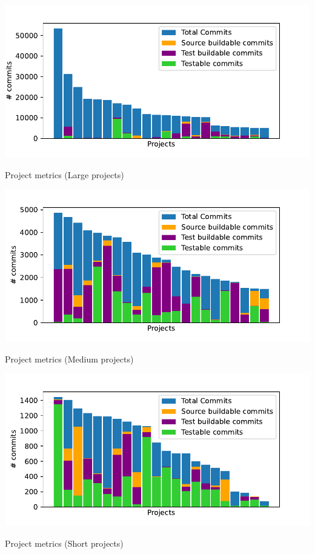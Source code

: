 \begin{table}[!htb]
    \centering
    \begin{minipage}{.5\linewidth}
        \centering    
        \includegraphics[width=\linewidth]{pages/02-Testability/images/Many4j 1-22.pdf}
        \caption{Project metrics (Large projects)}
        \label{fig:many4j-1-bar-chart}
    \end{minipage}%
    \begin{minipage}{.5\linewidth}
        \centering    
        \includegraphics[width=\linewidth]{pages/02-Testability/images/Many4j 23-44.pdf}
        \caption{Project metrics (Medium projects)}
        \label{fig:many4j-2-bar-chart}
    \end{minipage} 
    \begin{minipage}{.5\linewidth}
        \centering    
        \includegraphics[width=\linewidth]{pages/02-Testability/images/Many4j 45-66.pdf}
        \caption{Project metrics (Short projects)}
        \label{fig:many4j-3-bar-chart}
    \end{minipage}
\end{table}
